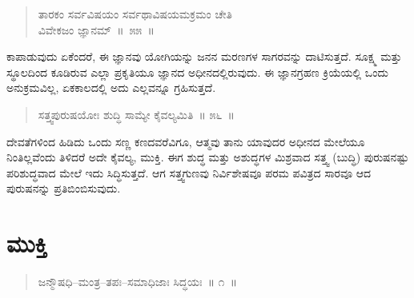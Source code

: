 \vspace{-0.2cm}

\begin{verse}
ತಾರಕಂ ಸರ್ವವಿಷಯಂ ಸರ್ವಥಾವಿಷಯಮಕ್ರಮಂ ಚೇತಿ\\
 ವಿವೇಕಜಂ ಜ್ಞಾನಮ್​~\hfill{॥~೫೫~॥}
\end{verse}

\vspace{-0.4cm}


\vspace{0.2cm}

ಕಾಪಾಡುವುದು ಏಕೆಂದರೆ, ಈ ಜ್ಞಾನವು ಯೋಗಿಯನ್ನು ಜನನ ಮರಣಗಳ ಸಾಗರವನ್ನು ದಾಟಿಸುತ್ತದೆ. ಸೂಕ್ಷ್ಮ ಮತ್ತು ಸ್ಥೂಲದಿಂದ ಕೂಡಿರುವ ಎಲ್ಲಾ ಪ್ರಕೃತಿಯೂ ಜ್ಞಾನದ ಅಧೀನದಲ್ಲಿರುವುದು. ಈ ಜ್ಞಾನಗ್ರಹಣ ಕ್ರಿಯೆಯಲ್ಲಿ ಒಂದು ಅನುಕ್ರಮವಿಲ್ಲ, ಏಕಕಾಲದಲ್ಲಿ ಅದು ಎಲ್ಲವನ್ನೂ ಗ್ರಹಿಸುತ್ತದೆ. 

\vspace{-0.2cm}

\begin{verse}
ಸತ್ತ್ವಪುರುಷಯೋಃ ಶುದ್ಧಿ ಸಾಮ್ಯೇ ಕೈವಲ್ಯಮಿತಿ~॥ ೫೬~॥
\end{verse}

\vspace{-0.4cm}


\vspace{0.2cm}

ದೇವತೆಗಳಿಂದ ಹಿಡಿದು ಒಂದು ಸಣ್ಣ ಕಣದವರೆವಿಗೂ, ಆತ್ಮವು ತಾನು ಯಾವುದರ ಅಧೀನದ ಮೇಲೆಯೂ ನಿಂತಿಲ್ಲವೆಂದು ತಿಳಿದರೆ ಅದೇ ಕೈವಲ್ಯ, ಮುಕ್ತಿ. ಈಗ ಶುದ್ಧ ಮತ್ತು ಅಶುದ್ಧಗಳ ಮಿಶ್ರವಾದ ಸತ್ತ್ವ (ಬುದ್ಧಿ) ಪುರುಷನಷ್ಟು ಪರಿಶುದ್ಧವಾದ ಮೇಲೆ ಇದು ಸಿದ್ಧಿಸುತ್ತದೆ. ಆಗ ಸತ್ತ್ವಗುಣವು ನಿರ್ವಿಶೇಷವೂ ಪರಮ ಪವಿತ್ರದ ಸಾರವೂ ಆದ ಪುರುಷನನ್ನು ಪ್ರತಿಬಿಂಬಿಸುವುದು.

\chapter{ಮುಕ್ತಿ}%

\vspace{0.1cm}

\begin{verse}
ಜನ್ಮೌಷಧಿ–ಮಂತ್ರ–ತಪಃ–ಸಮಾಧಿಜಾಃ ಸಿದ್ಧಯಃ~॥ ೧~॥
\end{verse}

\vspace{-0.34cm}


